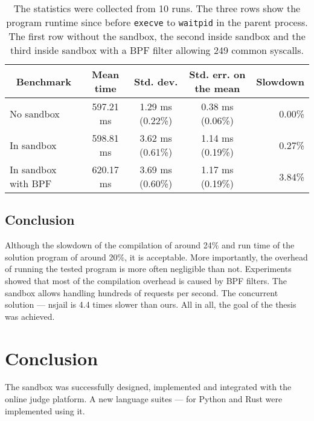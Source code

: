 \documentclass[en]{pracamgr}
\begin{document}
\begin{table}[h]
\centering
\begin{tabular}{|l|c|c|c|r|}
\hline
\multicolumn{1}{|c|}{Benchmark} & Mean time & Std. dev. & Std. err. on the mean & \multicolumn{1}{c|}{Slowdown} \\
\hline
No sandbox          & 597.21 ms & 1.29 ms (0.22\%) & 0.38 ms (0.06\%) & 0.00\% \\
In sandbox          & 598.81 ms & 3.62 ms (0.61\%) & 1.14 ms (0.19\%) & 0.27\% \\
In sandbox with BPF & 620.17 ms & 3.69 ms (0.60\%) & 1.17 ms (0.19\%) & 3.84\% \\
\hline
\end{tabular}
\caption{The statistics were collected from 10 runs. The three rows show the program runtime since before \texttt{execve} to \texttt{waitpid} in the parent process. The first row without the sandbox, the second inside sandbox and the third inside sandbox with a BPF filter allowing 249 common syscalls.}
\label{table:million_lseek}
\end{table}

\fi

\section{Conclusion}

Although the slowdown of the compilation of around 24\% and run time of the solution program of around 20\%, it is acceptable. More importantly, the overhead of running the tested program is more often negligible than not. Experiments showed that most of the compilation overhead is caused by BPF filters. The sandbox allows handling hundreds of requests per second. The concurrent solution --- nsjail is 4.4 times slower than ours. All in all, the goal of the thesis was achieved.


\chapter{Conclusion}\label{chapter:conclusion}

The sandbox was successfully designed, implemented and integrated with the online judge platform. A new language suites --- for Python and Rust were implemented using it.
\end{document}
